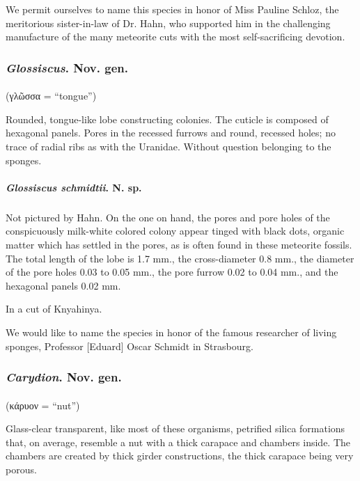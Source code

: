 \documentclass[a4paper, 12pt, oneside]{article}
\begin{document}
We permit ourselves to name this species in honor of Miss Pauline Schloz, the meritorious sister-in-law of Dr. Hahn, who supported him in the challenging manufacture of the many meteorite cuts with the most self-sacrificing devotion.

\subsubsection{\emph{Glossiscus}. Nov. gen.}
\paragraph*{}
(γλῶσσα = ``tongue'')%

Rounded, tongue-like lobe constructing colonies. The cuticle is composed of hexagonal panels. Pores in the recessed furrows and round, recessed holes; no trace of radial ribs as with the Uranidae. Without question belonging to the sponges.
\paragraph{\emph{Glossiscus schmidtii}. N. sp.}
\subparagraph{}
Not pictured by Hahn. On the one on hand, the pores and pore holes of the conspicuously milk-white colored colony appear tinged with black dots, organic matter which has settled in the pores, as is often found in these meteorite fossils. The total length of the lobe is 1.7 mm., the cross-diameter 0.8 mm., the diameter of the pore holes 0.03 to 0.05 mm., the pore furrow 0.02 to 0.04 mm., and the hexagonal panels 0.02 mm.

In a cut of Knyahinya.

We would like to name the species in honor of the famous researcher of living sponges, Professor [Eduard] Oscar Schmidt in Strasbourg.
\subsubsection{\emph{Carydion}. Nov. gen.}
\paragraph*{}
(κάρυον = ``nut'')%

Glass-clear transparent, like most of these organisms, petrified silica formations that, on average, resemble a nut with a thick carapace and chambers inside. The chambers are created by thick girder constructions, the thick carapace being very porous.
\end{document}
